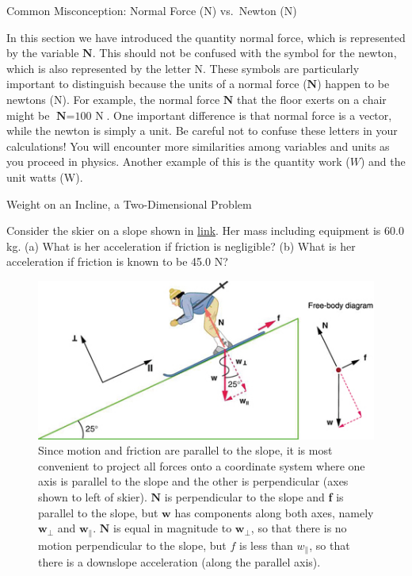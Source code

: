 \documentclass[
]{book}
\newenvironment{note}{}{}
\begin{document}
\hypertarget{fs-id2016495}{}
\begin{note}

Common Misconception: Normal Force (N) vs.~Newton (N)

In this section we have introduced the quantity normal force, which is
represented by the variable \(\textbf{N}{}\). This should not be confused
with the symbol for the newton, which is also represented by the letter
N. These symbols are particularly important to distinguish because the
units of a normal force (\(\textbf{N}{}\)) happen to be newtons (N). For
example, the normal force \(\textbf{N}{}\) that the floor exerts on a
chair might be \({\textbf{N} = \text{100\ N}}{}\). One important
difference is that normal force is a vector, while the newton is simply
a unit. Be careful not to confuse these letters in your calculations!
You will encounter more similarities among variables and units as you
proceed in physics. Another example of this is the quantity work (\(W{}\))
and the unit watts (W).

\end{note}

\hypertarget{fs-id2627411}{}
Weight on an Incline, a Two-Dimensional Problem

Consider the skier on a slope shown in
\protect\hyperlink{import-auto-id2149297}{link}. Her mass
including equipment is 60.0 kg. (a) What is her acceleration if friction
is negligible? (b) What is her acceleration if friction is known to be
45.0 N?

\begin{figure}
\hypertarget{import-auto-id2149297}{%
\centering
\includegraphics{images/Figure_04_05_02.jpg}
\caption{Since motion and friction are parallel to the slope, it is most
convenient to project all forces onto a coordinate system where one axis
is parallel to the slope and the other is perpendicular (axes shown to
left of skier). \(\textbf{N}{}\) is perpendicular to the slope and \textbf{f}
is parallel to the slope, but \(\textbf{w}{}\) has components along both
axes, namely \(\textbf{w}_{\bot}{}\) and \(\textbf{w}_{\parallel}{}\).
\(\textbf{N}{}\)\textbf{} is equal in magnitude
to \(\textbf{w}_{\bot}{}\), so that there is no motion perpendicular to
the slope, but \(f{}\) is less than \(w_{\parallel}{}\), so that there is a
downslope acceleration (along the parallel
axis).}\label{import-auto-id2149297}
}
\end{figure}
\end{document}
